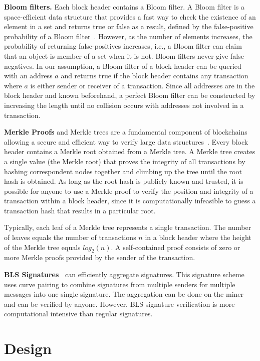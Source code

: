 \documentclass[conference]{IEEEtran}
\begin{document}
\textbf{Bloom filters.} Each block header contains a Bloom filter. A Bloom filter is a space-efficient data structure that provides a fast way to check the existence of an element in a set and returns true or false as a result, defined by the false-positive probability of a Bloom filter~\cite{BloomFilter}. However, as the number of elements increases, the probability of returning false-positives increases, i.e., a Bloom filter can claim that an object is member of a set when it is not. Bloom filters never give false-negatives. In our assumption, a Bloom filter of a block header can be queried with an address $a$ and returns true if the block header contains any transaction where $a$ is either sender or receiver of a transaction. Since all addresses are in the block header and known beforehand, a perfect Bloom filter can be constructed by increasing the length until no collision occurs with addresses not involved in a transaction.

\textbf{Merkle Proofs} and Merkle trees are a fundamental component of blockchains allowing a secure and efficient way to verify large data structures~\cite{MerkleTree}. Every block header contains a Merkle root obtained from a Merkle tree. A Merkle tree creates a single value (the Merkle root) that proves the integrity of all transactions by hashing correspondent nodes together and climbing up the tree until the root hash is obtained. As long as the root hash is publicly known and trusted, it is possible for anyone to use a Merkle proof to verify the position and integrity of a transaction within a block header, since it is computationally infeasible to guess a transaction hash that results in a particular root.

Typically, each leaf of a Merkle tree represents a single transaction. The number of leaves equals the number of transactions $n$ in a block header where the height of the Merkle tree equals $log_2(n)$. A self-contained proof consists of zero or more Merkle proofs provided by the sender of the transaction.

\textbf{BLS Signatures~\cite{BLS}} can efficiently aggregate signatures. This signature scheme uses curve pairing to combine signatures from multiple senders for multiple messages into one single signature. The aggregation can be done on the miner and can be verified by anyone. However, BLS signature verification is more computational intensive than regular signatures.

\section{Design}
\end{document}
